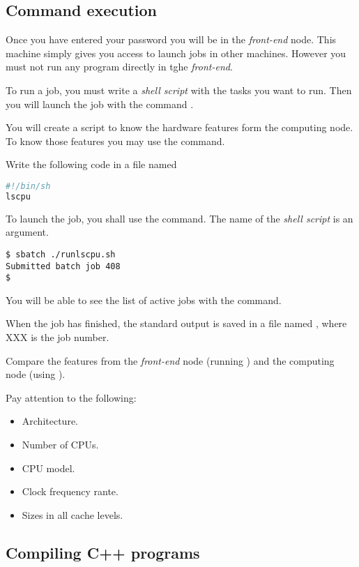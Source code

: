 \subsection{Command execution}

Once you have entered your password you will be in the \emph{front-end} node.
This machine simply gives you access to launch jobs in other machines.
However you must not run any program directly in tghe \emph{front-end}.

To run a job, you must write a \emph{shell script} with the tasks you want
to run. Then you will launch the job with the command .

You will create a script to know the hardware features form the computing node.
To know those features you may use the  command.

Write the following code in a file named 

\begin{lstlisting}[language=bash,frame=single,title={File: runlscpu.sh}]
#!/bin/sh
lscpu
\end{lstlisting}

To launch the job, you shall use the  command.
The name of the \emph{shell script} is an argument.

\begin{lstlisting}[style=terminal]
$ sbatch ./runlscpu.sh
Submitted batch job 408
$
\end{lstlisting}

You will be able to see the list of active jobs with the  command.

When the job has finished, the standard output is saved in a file named
, where XXX is the job number.

Compare the features from the \emph{front-end} node (running )
and the computing node (using ).

Pay attention to the following:
\begin{itemize}
  \item Architecture.
  \item Number of CPUs.
  \item CPU model.
  \item Clock frequency rante.
  \item Sizes in all cache levels.
\end{itemize}

\subsection{Compiling C++ programs}

